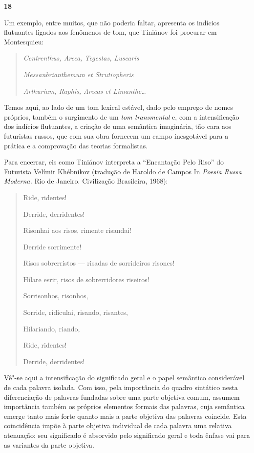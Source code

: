 \textbf{18}

Um exemplo, entre muitos, que não poderia faltar, apresenta os indícios
flutuantes ligados aos fenômenos de tom, que Tiniánov foi procurar em
Montesquieu:

\begin{quote}
\emph{Centrenthus, Areca, Tegestas, Luscaris}

\emph{Messanbrianthemum et Strutiopheris}

\emph{Arthuriam, Raphis, Arecas et Limanthe\ldots{}}
\end{quote}

Temos aqui, ao lado de um tom lexical estável, dado pelo emprego de
nomes próprios, também o surgimento de um \emph{tom transmental} e, com
a intensificação dos indícios flutuantes, a criação de uma semântica
imaginária, tão cara aos futuristas russos, que com sua obra fornecem um
campo inesgotável para a prática e a comprovação das teorias
formalistas.

Para encerrar, eis como Tiniánov interpreta a ``Encantação Pelo Riso''
do Futurista Velímir Khébnikov (tradução de Haroldo de Campos In
\emph{Poesia Russa Moderna.} Rio de Janeiro. Civilização Brasileira,
1968):

\begin{quote}
Ride, ridentes!

Derride, derridentes!

Risonhai aos risos, rimente risandai!

Derride sorrimente!

Risos sobrerristos --- risadas de sorrideiros risones!

Hílare esrir, risos de sobrerridores riseiros!

Sorrisonhos, risonhos,

Sorride, ridiculai, risando, risantes,

Hilariando, riando,

Ride, ridentes!

Derride, derridentes!
\end{quote}

Vê"-se aqui a intensificação do significado geral e o papel semântico
considerável de cada palavra isolada. Com isso, pela importância do
quadro sintático nesta diferenciação de palavras fundadas sobre uma
parte objetiva comum, assumem importância também os próprios elementos
formais das palavras, cuja semântica emerge tanto mais forte quanto mais
a parte objetiva das palavras coincide. Esta coincidência impõe à parte
objetiva individual de cada palavra uma relativa atenuação: seu
significado é absorvido pelo significado geral e toda ênfase vai para as
variantes da parte objetiva.

